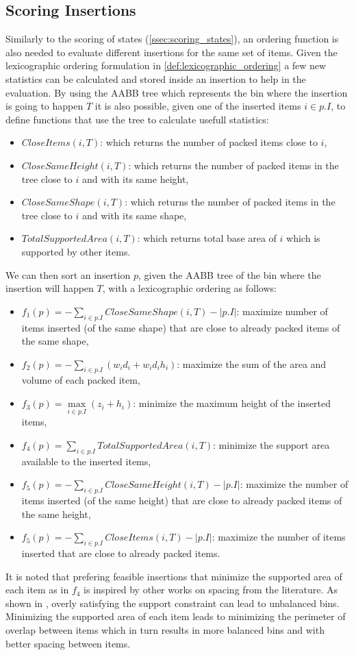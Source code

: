 \subsection{Scoring Insertions}
\label{ssec:scoring_insertions}%
Similarly to the scoring of states (\cref{ssec:scoring_states}), an ordering function is also needed to evaluate different insertions for the same set of items.
Given the lexicographic ordering formulation in \cref{def:lexicographic_ordering} a few new statistics can be calculated and stored inside an insertion to help in the evaluation.
By using the AABB tree which represents the bin where the insertion is going to happen $T$ it is also possible, given one of the inserted items $i \in p.I$, to define functions that use the tree to calculate usefull statistics:
\begin{itemize}
    \item $CloseItems(i, T)$: which returns the number of packed items close to $i$,
    \item $CloseSameHeight(i, T)$: which returns the number of packed items in the tree close to $i$ and with its same height,
    \item $CloseSameShape(i, T)$: which returns the number of packed items in the tree close to $i$ and with its same shape,
    \item $TotalSupportedArea(i, T)$: which returns total base area of $i$ which is supported by other items.
\end{itemize}
We can then sort an insertion $p$, given the AABB tree of the bin where the insertion will happen $T$, with a lexicographic ordering as follows:
\begin{itemize}
    \item $f_1(p) = -\sum\limits_{i \in p.I}{CloseSameShape(i, T)} - |p.I|$: maximize number of items inserted (of the same shape) that are close to already packed items of the same shape,
    \item $f_2(p) = -\sum\limits_{i \in p.I}{(w_i d_i + w_i d_i h_i)}$: maximize the sum of the area and volume of each packed item,
    \item $f_3(p) = \max\limits_{i \in p.I}(z_i + h_i)$: minimize the maximum height of the inserted items,
    \item $f_4(p) = \sum\limits_{i \in p.I}{TotalSupportedArea(i, T)}$: minimize the support area available to the inserted items,
    \item $f_5(p) = -\sum\limits_{i \in p.I}{CloseSameHeight(i, T)} - |p.I|$: maximize the number of items inserted (of the same height) that are close to already packed items of the same height,
    \item $f_5(p) = -\sum\limits_{i \in p.I}{CloseItems(i, T)} - |p.I|$: maximize the number of items inserted that are close to already packed items.
\end{itemize}
It is noted that prefering feasible insertions that minimize the supported area of each item as in $f_4$ is inspired by other works on spacing from the literature.
As shown in \cite{elhedhli2019three}, overly satisfying the support constraint can lead to unbalanced bins.
Minimizing the supported area of each item leads to minimizing the perimeter of overlap between items which in turn results in more balanced bins and with better spacing between items.